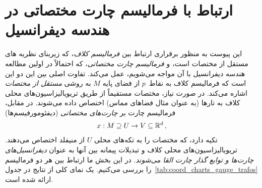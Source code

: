 

\section{ارتباط با فرمالیسم چارت مختصاتی در هندسه دیفرانسیل}
\label{apx:coordinate_bases}


این پیوست به منظور برقراری ارتباط بین \emph{فرمالیسم کلاف}، که زیربنای نظریه های مستقل از مختصات است، و \emph{فرمالیسم چارت مختصاتی}، که احتمالاً در اولین مطالعه هندسه دیفرانسیل با آن مواجه می‌شویم، عمل می‌کند.
تفاوت اصلی بین این دو این است که فرمالیسم کلاف به نقاط~$p$ از فضای پایه $M$ به روشی \emph{مستقل از مختصات} اشاره می‌کند.
در صورت نیاز، مختصات مستقیماً از طریق تریویالیزاسیون‌های محلی کلاف به تارها (به عنوان مثال فضاهای مماس) اختصاص داده می‌شوند.
در مقابل، فرمالیسم چارت بر \emph{چارت‌های مختصاتی} (دیفئومورفیسم‌ها)
\begin{align}
	x: M \supseteq U \to V \subseteq \mathbb{R}^d \,,
\end{align}
تکیه دارد، که مختصات را به تکه‌های محلی $U$ از منیفلد اختصاص می‌دهند.
تریویالیزاسیون‌های محلی کلاف و تبدیلات پیمانه بین آنها به عنوان \emph{دیفرانسیل‌های چارت‌ها و توابع گذار چارت القا می‌شوند}.
در این بخش ما ارتباط بین هر دو فرمالیسم را بررسی می‌کنیم.
یک نمای کلی از نتایج در جدول~\ref{tab:coord_charts_gauge_trafos} ارائه شده است.


\etocsettocstyle{}{} %
\localtableofcontents



